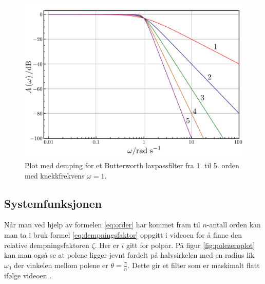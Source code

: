 \begin{figure}[H]
	\centering
	\includegraphics[scale=0.2]{./Images/02Concept/04orders.png}
	\caption{Plot med demping for et Butterworth lavpassfilter fra 1. til 5. orden med knekkfrekvens $\omega=1$.\cite{wikipediacontributors_2022_butterworth}}
	\label{fig:05order}
\end{figure}

\newpage

\subsection{Systemfunksjonen}
\label{sec:Systemfunksjonen}

Når man ved hjelp av formelen \ref{eq:order} har kommet fram til $n$-antall orden kan man ta i bruk formel \ref{eq:dempningsfaktor} oppgitt i videoen \cite{lundheim_butterworth} for å finne den relative dempningsfaktoren $\zeta$. Her er $i$ gitt for polpar. På figur \ref{fig:polezeroplot} kan man også se at polene ligger jevnt fordelt på halvsirkelen med en radius lik $\omega_0$ der vinkelen mellom polene er $\theta=\frac{\pi}{n}$. Dette gir et filter som er maskimalt flatt ifølge videoen \cite{lundheim}.

